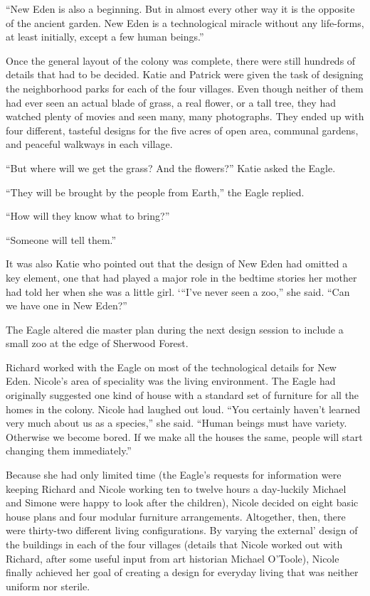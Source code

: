 \documentclass[]{article}
\begin{document}
{“New Eden is also a beginning. But in almost every other way it is the opposite of the ancient garden. New Eden is a technological miracle without any life-forms, at least initially, except a few human beings.”

Once the general layout of the colony was complete, there were still hundreds of details that had to be decided. Katie and Patrick were given the task of designing the neighborhood parks for each of the four villages. Even though neither of them had ever seen an actual blade of grass, a real flower, or a tall tree, they had watched plenty of movies and seen many, many photographs. They ended up with four different, tasteful designs for the five acres of open area, communal gardens, and peaceful walkways in each village.

“But where will we get the grass? And the flowers?” Katie asked the Eagle.

“They will be brought by the people from Earth,” the Eagle replied.

“How will they know what to bring?”

“Someone will tell them.”

It was also Katie who pointed out that the design of New Eden had omitted a key element, one that had played a major role in the bedtime stories her mother had told her when she was a little girl. ‘“I’ve never seen a zoo,” she said. “Can we have one in New Eden?”

The Eagle altered die master plan during the next design session to include a small zoo at the edge of Sherwood Forest.

Richard worked with the Eagle on most of the technological details for New Eden. Nicole’s area of speciality was the living environment. The Eagle had originally suggested one kind of house with a standard set of furniture for all the homes in the colony. Nicole had laughed out loud. “You certainly haven’t learned very much about us as a species,” she said. “Human beings must have variety. Otherwise we become bored. If we make all the houses the same, people will start changing them immediately.”

Because she had only limited time (the Eagle’s requests for information were keeping Richard and Nicole working ten to twelve hours a day-luckily Michael and Simone were happy to look after the children), Nicole decided on eight basic house plans and four modular furniture arrangements. Altogether, then, there were thirty-two different living configurations. By varying the external’ design of the buildings in each of the four villages (details that Nicole worked out with Richard, after some useful input from art historian Michael O’Toole), Nicole finally achieved her goal of creating a design for everyday living that was neither uniform nor sterile.

}
\end{document}
